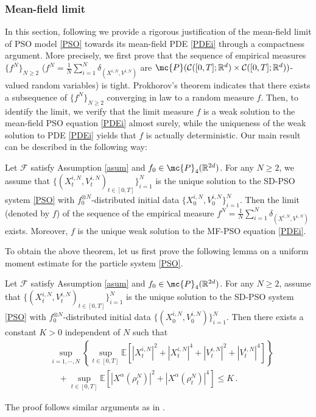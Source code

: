 \documentclass{ims9x6}
\newcommand{\CR}{\mathcal{C}([0,T];\mathbb{R}^d)}
\newcommand{\EE}{\mathbb{E}}
\newcommand{\TE}{\mathcal{F}}
\newcommand{\RR}{\mathbb{R}}
\begin{document}
\subsubsection{Mean-field limit}\label{meanPSO1}
In this section, following \cite{huang2021mean1} we provide a rigorous justification of the mean-field limit of  PSO model \eqref{PSO} towards its mean-field PDE \eqref{PDEi} through a compactness argument. More precisely, we first prove  that the sequence of empirical measures $\{f^N\}_{N\geq 2}$ ($f^N=\frac{1}{N}\sum_{i=1}^{N}\delta_{(X^{i,N},V^{i,N})}$ are $\mc{P}(\CR\times\CR)$-valued random variables) is tight.  Prokhorov's theorem indicates that there exists a subsequence of $\{f^N\}_{N\geq 2}$ converging in law to a random measure $f$. Then, to identify the limit, we verify that the limit measure $f$ is a weak solution to the mean-field PSO equation \eqref{PDEi}  almost surely, while the uniqueness of the weak solution to PDE \eqref{PDEi} yields that $f$ is actually deterministic.  Our main result can be described in the following way:
\begin{theo-frmd}\label{thmmean}
	Let $\TE$ satisfy Assumption \ref{asum} and $f_0\in \mc{P}_4(\RR^{2d})$. For any $N\geq 2$, we assume that $\{(X_t^{i,N},V_t^{i,N})_{t\in[0,T]}\}_{i=1}^N$ is the unique solution to the SD-PSO system \eqref{PSO} with $f_0^{\otimes N}$-distributed initial data $\{X_0^{i,N},V_0^{i,N}\}_{i=1}^N$.  Then the limit (denoted by $f$) of the sequence of the empirical measure $f^N=\frac{1}{N}\sum_{i=1}^N\delta_{(X^{i,N},V^{i,N})}$ exists. Moreover, $f$ is the unique weak solution to the MF-PSO equation \eqref{PDEi}.
\end{theo-frmd}
To obtain the above theorem,  let us first prove the following lemma on a uniform moment estimate for the particle system \eqref{PSO}.
\begin{lemma}\label{lem2mon}
	Let $\TE$ satisfy Assumption \ref{asum} and $f_0\in \mc{P}_4(\RR^{2d})$. For any $N\geq 2$, assume that $\{(X_t^{i,N},V_t^{i,N})_{t\in[0,T]}\}_{i=1}^N$ is the unique solution to the SD-PSO system \eqref{PSO} with $f_0^{\otimes N}$-distributed initial data $\{(X_0^{i,N},V_0^{i,N})\}_{i=1}^N$. Then there exists a constant $K>0$ independent of $N$ such that
	\begin{equation}\label{est-lem2mon}
	\begin{split}
	&\sup\limits_{i=1,\cdots,N} \left\{
	\sup\limits_{t\in[0,T]}
	\EE\left[|X_t^{i,N}|^2+|X_t^{i,N}|^4+|V_t^{i,N}|^2+|V_t^{i,N}|^4\right]	\right\}\\ 
	&\quad +\sup\limits_{t\in[0,T]}\EE\left[|X^\alpha(\rho^N_t)|^2+|X^\alpha(\rho^N_t)|^4\right]
	\leq K\,. 
	\end{split}
	\end{equation}
\end{lemma}
The proof follows similar arguments as in \cite[Lemma 3.4]{carrillo2018analytical}.
\end{document}
